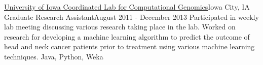 \resumePosition
    {\href{http://genome.uiowa.edu/clcg/}{University of Iowa Coordinated Lab for Computational Genomics}}{Iowa City, IA}
    {Graduate Research Assistant}{August 2011 - December 2013}
\resumeItemListStart
{}
    {Participated in weekly lab meeting discussing various research taking place in the lab. Worked on research for developing a machine learning algorithm to predict the outcome of head and neck cancer patients prior to treatment using various machine learning techniques.}
    {Java, Python, Weka}
\resumeItemListEnd